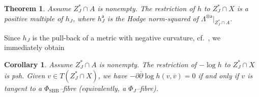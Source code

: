 \documentclass[12pt]{amsart}
\numberwithin{equation}{section}
\numberwithin{table}{section}
\def\sfa{\mathsf{a}}
\def\ot{\otimes}
\newtheorem{corollary}[equation]{Corollary}
\newtheorem{theorem}[equation]{Theorem}
\theoremstyle{definition}
\theoremstyle{definition}
\theoremstyle{remark}
\def\ddb{\partial\overline{\partial}}
\def\PhiS{\Phi_\mathrm{SBB}}
\begin{document}
\begin{theorem} \label{T:hI}
Assume $Z_J^* \cap A$ is nonempty.  The restriction of $h$ to $Z_J^* \cap X$ is a positive multiple of $h_J$, where $h_J^\sfa$ is the Hodge norm-squared of $\Lambda^{\ot \sfa} \big|_{Z_J^* \cap A}$.
\end{theorem}

\noindent Since $h_J$ is the pull-back of a metric with negative curvature, cf.~\cite[(4.66)]{MR0229641}, we immediately obtain

\begin{corollary} \label{C:hI}
Assume $Z_J^* \cap A$ is nonempty. The restriction of $-\log h$ to $Z_J^* \cap X$ is psh.  Given $v \in T(Z_J^* \cap X)$, we have $-\ddb\log h(v,\overline v) = 0$ if and only if $v$ is tangent to a $\PhiS$--fibre (equivalently, a $\Phi_J$--fibre).
\end{corollary}
\end{document}
